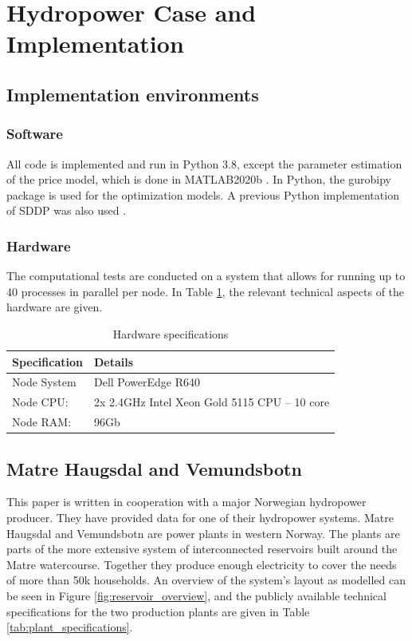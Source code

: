 
\section{Hydropower Case and Implementation }
\label{case and implementation}

\subsection{Implementation environments}
\label{case:Implementation}
\subsubsection{Software}
\label{case:software}
All code is implemented and run in Python 3.8, except the parameter estimation of the price model, which is done in MATLAB2020b \cite{goodwin2013a}. In Python, the gurobipy package is used for the optimization models. A previous Python implementation of SDDP was also used \cite{ding2019python}.
\subsubsection{Hardware}
\label{case:hardware}
The computational tests are conducted on a system that allows for running up to 40 processes in parallel per node. In Table \ref{tab:hardware}, the relevant technical aspects of the hardware are given. 

\begin{table}[h]
\caption[Hardware specifications]{Hardware specifications}
\label{tab:hardware}
\centering
\begin{tabular} {l l}
\toprule
Specification &\hspace{5mm}Details\\
\midrule
Node System & \hspace{5mm} Dell PowerEdge R640\\
Node CPU: & \hspace{5mm} 2x 2.4GHz Intel Xeon Gold 5115 CPU – 10 core\\
Node RAM: & \hspace{5mm} 96Gb\\
\bottomrule
\end{tabular}
\end{table}
\label{computational_study:the case}


\subsection{Matre Haugsdal and Vemundsbotn}
\label{compuational_study:example_system}
This paper is written in cooperation with a major Norwegian hydropower producer. They have provided data for one of their hydropower systems. Matre Haugsdal and Vemundsbotn are power plants in western Norway. The plants are parts of the more extensive system of interconnected reservoirs built around the Matre watercourse. Together they produce enough electricity to cover the needs of more than 50k households. An overview of the system's layout as modelled can be seen in Figure \ref{fig:reservoir_overview}, and the publicly available technical specifications for the two production plants are given in Table \ref{tab:plant_specifications}.

